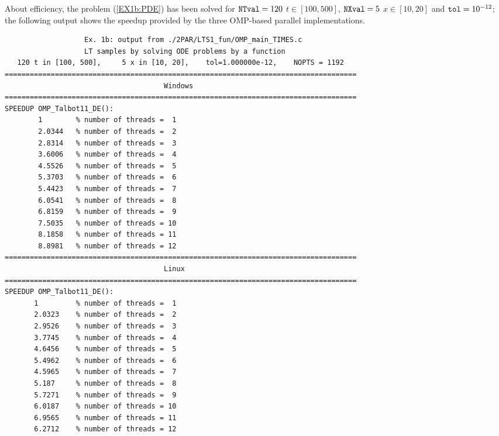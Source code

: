 \documentclass[a4paper,10pt]{report}%
\begin{document}
About efficiency, the problem (\ref{EX1b:PDE}) has been solved for ${\tt NTval}=120$ $t\in[100,500]$, ${\tt NXval}=5$
$x\in[10,20]$ and ${\tt tol}=10^{-12}$; the following output shows the speedup provided by the three OMP-based
parallel implementations.
\begin{lstlisting}
                   Ex. 1b: output from ./2PAR/LTS1_fun/OMP_main_TIMES.c
                   LT samples by solving ODE problems by a function
   120 t in [100, 500],     5 x in [10, 20],    tol=1.000000e-12,    NOPTS = 1192
====================================================================================
                                      Windows
====================================================================================
SPEEDUP OMP_Talbot11_DE():
        1        % number of threads =  1
        2.0344   % number of threads =  2
        2.8314   % number of threads =  3
        3.6006   % number of threads =  4
        4.5526   % number of threads =  5
        5.3703   % number of threads =  6
        5.4423   % number of threads =  7
        6.0541   % number of threads =  8
        6.8159   % number of threads =  9
        7.5035   % number of threads = 10
        8.1858   % number of threads = 11
        8.8981   % number of threads = 12
====================================================================================
                                      Linux
====================================================================================
SPEEDUP OMP_Talbot11_DE():
       1         % number of threads =  1
       2.0323    % number of threads =  2
       2.9526    % number of threads =  3
       3.7745    % number of threads =  4
       4.6456    % number of threads =  5
       5.4962    % number of threads =  6
       4.5965    % number of threads =  7
       5.187     % number of threads =  8
       5.7271    % number of threads =  9
       6.0187    % number of threads = 10
       6.9565    % number of threads = 11
       6.2712    % number of threads = 12


\end{lstlisting}
\end{document}
